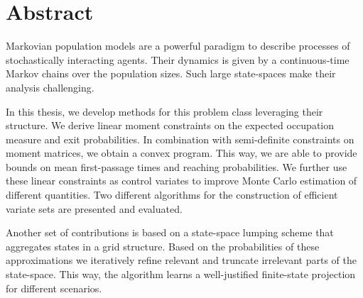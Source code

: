 
\chapter*{Abstract}
Markovian population models are a powerful paradigm to describe processes of stochastically interacting agents. Their dynamics is given by a continuous-time Markov chains over the population sizes. Such large state-spaces make their analysis challenging.

In this thesis, we develop methods for this problem class leveraging their structure. We derive linear moment constraints on the expected occupation measure and exit probabilities. In combination with semi-definite constraints on moment matrices, we obtain a convex program. This way, we are able to provide bounds on mean first-passage times and reaching probabilities. We further use these linear constraints as control variates to improve Monte Carlo estimation of different quantities. Two different algorithms for the construction of efficient variate sets are presented and evaluated.

Another set of contributions is based on a state-space lumping scheme that aggregates states in a grid structure. Based on the probabilities of these approximations we iteratively refine relevant and truncate irrelevant parts of the state-space. This way, the algorithm learns a well-justified finite-state projection for different scenarios.

\cleardoublepage

